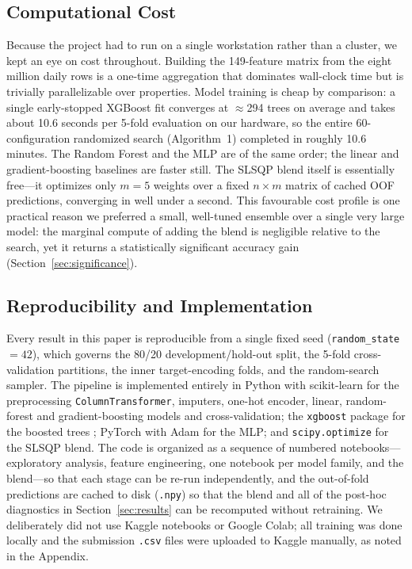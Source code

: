 \documentclass[journal]{IEEEtran}
\begin{document}
\subsection{Computational Cost}
\label{sec:cost}
Because the project had to run on a single workstation rather than a cluster, we
kept an eye on cost throughout. Building the 149-feature matrix from the eight
million daily rows is a one-time aggregation that dominates wall-clock time but
is trivially parallelizable over properties. Model training is cheap by
comparison: a single early-stopped XGBoost fit converges at $\approx$294 trees
on average and takes about 10.6 seconds per 5-fold evaluation on our hardware, so
the entire 60-configuration randomized search (Algorithm~1)
completed in roughly 10.6 minutes. The Random Forest and the MLP are of the same
order; the linear and gradient-boosting baselines are faster still. The SLSQP
blend itself is essentially free---it optimizes only $m=5$ weights over a fixed
$n\times m$ matrix of cached OOF predictions, converging in well under a second.
This favourable cost profile is one practical reason we preferred a small,
well-tuned ensemble over a single very large model: the marginal compute of
adding the blend is negligible relative to the search, yet it returns a
statistically significant accuracy gain (Section~\ref{sec:significance}).

\subsection{Reproducibility and Implementation}
\label{sec:repro}
Every result in this paper is reproducible from a single fixed seed
(\texttt{random\_state}~$=42$), which governs the 80/20 development/hold-out
split, the 5-fold cross-validation partitions, the inner target-encoding folds,
and the random-search sampler. The pipeline is implemented entirely in Python
with scikit-learn \cite{pedregosa2011sklearn} for the preprocessing
\texttt{ColumnTransformer}, imputers, one-hot encoder, linear, random-forest and
gradient-boosting models and cross-validation; the \texttt{xgboost} package for
the boosted trees \cite{chen2016xgboost}; PyTorch \cite{paszke2019pytorch} with
Adam \cite{kingma2015adam} for the MLP; and \texttt{scipy.optimize} for the SLSQP
blend. The code is organized as a sequence of numbered notebooks---exploratory
analysis, feature engineering, one notebook per model family, and the blend---so
that each stage can be re-run independently, and the out-of-fold predictions are
cached to disk (\texttt{.npy}) so that the blend and all of the post-hoc
diagnostics in Section~\ref{sec:results} can be recomputed without retraining.
We deliberately did not use Kaggle notebooks or Google Colab; all training was
done locally and the submission \texttt{.csv} files were uploaded to Kaggle
manually, as noted in the Appendix.
\end{document}
